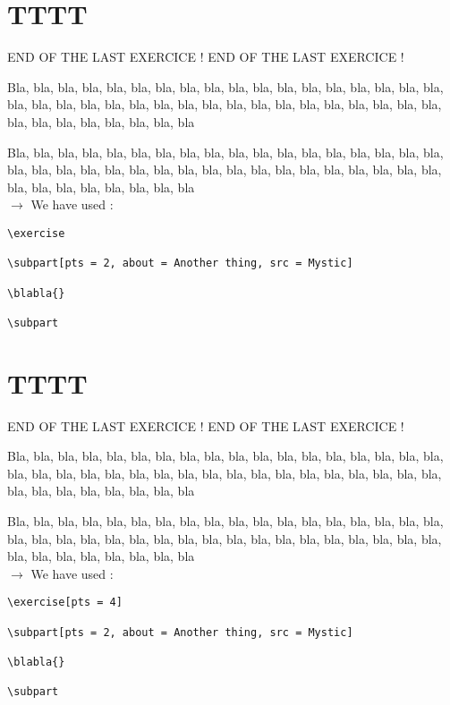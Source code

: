 \documentclass[12pt]{article}
\newcommand\blabla{%
		\noindent Bla, bla, bla, bla, bla, bla, bla, bla, bla, bla, bla,
		bla, bla, bla, bla, bla, bla, bla, bla, bla, bla, bla,
		bla, bla, bla, bla, bla, bla, bla, bla, bla, bla, bla,
		bla, bla, bla, bla, bla, bla, bla, bla, bla, bla, bla
	}
\newcommand\codeused{
		\blabla{} \medskip  \\ \noindent $\rightarrow$ We have used :
	}
\begin{document}
\newpage\section{TTTT}

\noindent END OF THE LAST EXERCICE ! END OF THE LAST EXERCICE !

\exercise
      
\subpart[pts = 2, about = Another thing, src = Mystic]

\blabla{}

\subpart

\codeused{}

\begin{verbatim}
\exercise
      
\subpart[pts = 2, about = Another thing, src = Mystic]

\blabla{}

\subpart
\end{verbatim}



\newpage\section{TTTT}

\noindent END OF THE LAST EXERCICE ! END OF THE LAST EXERCICE !

\exercise[pts = 4]
      
\subpart[pts = 2, about = Another thing, src = Mystic]

\blabla{}

\subpart

\codeused{}

\begin{verbatim}
\exercise[pts = 4]
      
\subpart[pts = 2, about = Another thing, src = Mystic]

\blabla{}

\subpart
\end{verbatim}
\end{document}
